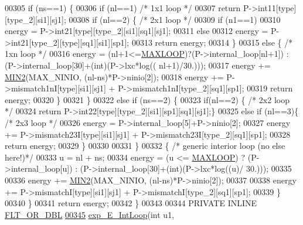 \begin{DoxyCode}
00305     \textcolor{keywordflow}{if} (ns==1) \{
00306       \textcolor{keywordflow}{if} (nl==1)                    \textcolor{comment}{/* 1x1 loop */}
00307         \textcolor{keywordflow}{return} P->int11[type][type\_2][si1][sj1];
00308       \textcolor{keywordflow}{if} (nl==2) \{                  \textcolor{comment}{/* 2x1 loop */}
00309         \textcolor{keywordflow}{if} (n1==1)
00310           energy = P->int21[type][type\_2][si1][sq1][sj1];
00311         \textcolor{keywordflow}{else}
00312           energy = P->int21[type\_2][type][sq1][si1][sp1];
00313         \textcolor{keywordflow}{return} energy;
00314       \}
00315       \textcolor{keywordflow}{else} \{  \textcolor{comment}{/* 1xn loop */}
00316         energy = (nl+1<=\hyperlink{energy__const_8h_ad1bd6eabac419670ddd3c9ed82145988}{MAXLOOP})?(P->internal\_loop[nl+1]) : (P->internal\_loop[30]+(int)(P->lxc*log((
      nl+1)/30.)));
00317         energy += \hyperlink{group__utils_ga2dd4a927a7f937f43a90c144d79107d8}{MIN2}(MAX\_NINIO, (nl-ns)*P->ninio[2]);
00318         energy += P->mismatch1nI[type][si1][sj1] + P->mismatch1nI[type\_2][sq1][sp1];
00319         \textcolor{keywordflow}{return} energy;
00320       \}
00321     \}
00322     \textcolor{keywordflow}{else} \textcolor{keywordflow}{if} (ns==2) \{
00323       \textcolor{keywordflow}{if}(nl==2)      \{              \textcolor{comment}{/* 2x2 loop */}
00324         \textcolor{keywordflow}{return} P->int22[type][type\_2][si1][sp1][sq1][sj1];\}
00325       \textcolor{keywordflow}{else} \textcolor{keywordflow}{if} (nl==3)\{              \textcolor{comment}{/* 2x3 loop */}
00326         energy = P->internal\_loop[5]+P->ninio[2];
00327         energy += P->mismatch23I[type][si1][sj1] + P->mismatch23I[type\_2][sq1][sp1];
00328         \textcolor{keywordflow}{return} energy;
00329       \}
00330 
00331     \}
00332     \{ \textcolor{comment}{/* generic interior loop (no else here!)*/}
00333       u = nl + ns;
00334       energy = (u <= \hyperlink{energy__const_8h_ad1bd6eabac419670ddd3c9ed82145988}{MAXLOOP}) ? (P->internal\_loop[u]) : (P->internal\_loop[30]+(int)(P->lxc*log((u)/
      30.)));
00335 
00336       energy += \hyperlink{group__utils_ga2dd4a927a7f937f43a90c144d79107d8}{MIN2}(MAX\_NINIO, (nl-ns)*P->ninio[2]);
00337 
00338       energy += P->mismatchI[type][si1][sj1] + P->mismatchI[type\_2][sq1][sp1];
00339     \}
00340   \}
00341   \textcolor{keywordflow}{return} energy;
00342 \}
00343 
00344 PRIVATE INLINE \hyperlink{group__data__structures_ga31125aeace516926bf7f251f759b6126}{FLT\_OR\_DBL}
\hypertarget{interior__loops_8h_source.tex_l00345}{}\hyperlink{group__loops_ga95de54d8a2a17645a95e0f34e189d9c9}{00345} \hyperlink{group__loops_ga95de54d8a2a17645a95e0f34e189d9c9}{exp\_E\_IntLoop}(\textcolor{keywordtype}{int} u1,

\end{DoxyCode}

